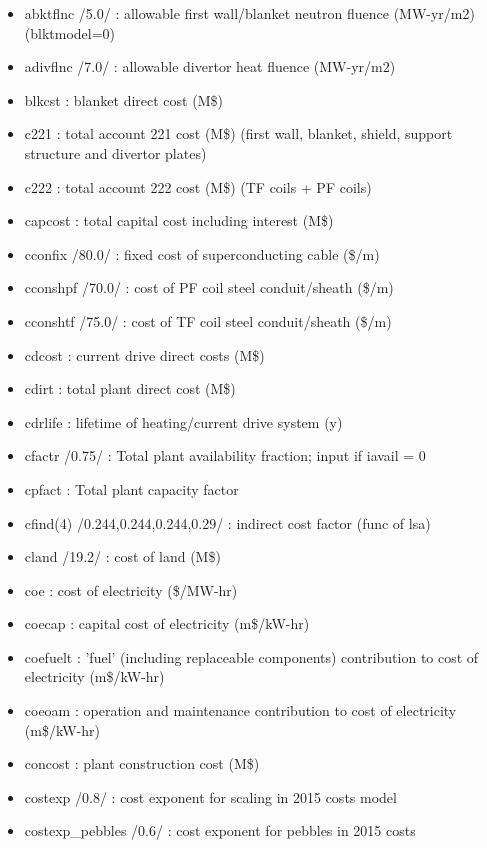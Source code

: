 \documentclass[
]{article}
\providecommand{\tightlist}{%
  \setlength{\itemsep}{0pt}\setlength{\parskip}{0pt}}
\begin{document}
\begin{itemize}
  \begin{itemize}
  \tightlist
  \item
    abktflnc /5.0/ : allowable first wall/blanket neutron fluence
    (MW-yr/m2) (blktmodel=0)
  \item
    adivflnc /7.0/ : allowable divertor heat fluence (MW-yr/m2)
  \item
    blkcst : blanket direct cost (M\$)
  \item
    c221 : total account 221 cost (M\$) (first wall, blanket, shield,
    support structure and divertor plates)
  \item
    c222 : total account 222 cost (M\$) (TF coils + PF coils)
  \item
    capcost : total capital cost including interest (M\$)
  \item
    cconfix /80.0/ : fixed cost of superconducting cable (\$/m)
  \item
    cconshpf /70.0/ : cost of PF coil steel conduit/sheath (\$/m)
  \item
    cconshtf /75.0/ : cost of TF coil steel conduit/sheath (\$/m)
  \item
    cdcost : current drive direct costs (M\$)
  \item
    cdirt : total plant direct cost (M\$)
  \item
    cdrlife : lifetime of heating/current drive system (y)
  \item
    cfactr /0.75/ : Total plant availability fraction; input if iavail =
    0
  \item
    cpfact : Total plant capacity factor
  \item
    cfind(4) /0.244,0.244,0.244,0.29/ : indirect cost factor (func of
    lsa)
  \item
    cland /19.2/ : cost of land (M\$)
  \item
    coe : cost of electricity (\$/MW-hr)
  \item
    coecap : capital cost of electricity (m\$/kW-hr)
  \item
    coefuelt : 'fuel' (including replaceable components) contribution to
    cost of electricity (m\$/kW-hr)
  \item
    coeoam : operation and maintenance contribution to cost of
    electricity (m\$/kW-hr)
  \item
    concost : plant construction cost (M\$)
  \item
    costexp /0.8/ : cost exponent for scaling in 2015 costs model
  \item
    costexp\_pebbles /0.6/ : cost exponent for pebbles in 2015 costs

\end{itemize}
\end{itemize}
\end{document}
